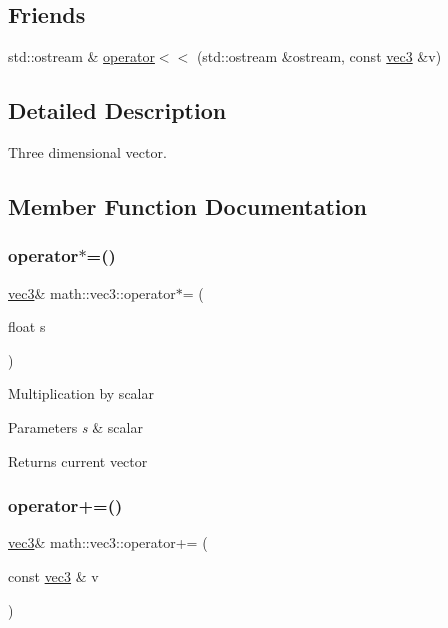\subsection*{Friends}
\begin{DoxyCompactItemize}
\item 
std\+::ostream \& \hyperlink{structmath_1_1vec3_a4bd64a414e31d04644f4caec34fcb8af}{operator$<$$<$} (std\+::ostream \&ostream, const \hyperlink{structmath_1_1vec3}{vec3} \&v)
\end{DoxyCompactItemize}


\subsection{Detailed Description}
Three dimensional vector. 

\subsection{Member Function Documentation}
\mbox{\label{structmath_1_1vec3_ad585c0077344f18e19adf83ff1a9b714}} 
\subsubsection{\texorpdfstring{operator$\ast$=()}{operator*=()}}
{\footnotesize\ttfamily \hyperlink{structmath_1_1vec3}{vec3}\& math\+::vec3\+::operator$\ast$= (\begin{DoxyParamCaption}\item[{float}]{s }\end{DoxyParamCaption})\hspace{0.3cm}{\ttfamily [inline]}}

Multiplication by scalar 
\begin{DoxyParams}{Parameters}
{\em s} & scalar \\
\hline
\end{DoxyParams}
\begin{DoxyReturn}{Returns}
current vector 
\end{DoxyReturn}
\mbox{\label{structmath_1_1vec3_a46cf290e5c6454b514e96b8d6bffdf2d}} 
\subsubsection{\texorpdfstring{operator+=()}{operator+=()}}
{\footnotesize\ttfamily \hyperlink{structmath_1_1vec3}{vec3}\& math\+::vec3\+::operator+= (\begin{DoxyParamCaption}\item[{const \hyperlink{structmath_1_1vec3}{vec3} \&}]{v }\end{DoxyParamCaption})\hspace{0.3cm}{\ttfamily [inline]}}

